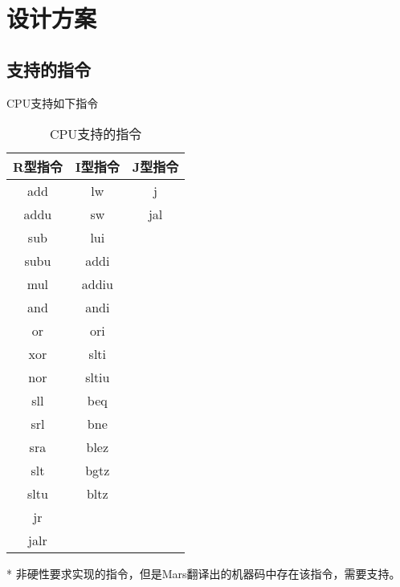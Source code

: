 \section{设计方案}

\subsection{支持的指令}
CPU支持如下指令

\begin{table}[H]
    \centering
    \begin{threeparttable}
    \begin{tabular}{ccc}
        \toprule
        R型指令 & I型指令 & J型指令 \\ 
        \midrule
        add  & lw    & j   \\
        addu & sw    & jal \\
        sub  & lui   &     \\
        subu & addi  &     \\
        mul  & addiu &     \\
        and  & andi  &     \\
        or   & ori\tnote{*} & \\
        xor  & slti  &     \\
        nor  & sltiu &     \\
        sll  & beq   &     \\
        srl  & bne   &     \\
        sra  & blez  &     \\
        slt  & bgtz  &     \\
        sltu & bltz  &     \\
        jr   &       &     \\
        jalr &       &     \\
        \bottomrule
    \end{tabular}
    \begin{tablenotes}
        \footnotesize
        \item[*] 非硬性要求实现的指令，但是Mars翻译出的机器码中存在该指令，需要支持。
    \end{tablenotes}
    \end{threeparttable}
    \caption{CPU支持的指令}
    \label{tab:supported-instruction}
\end{table}

